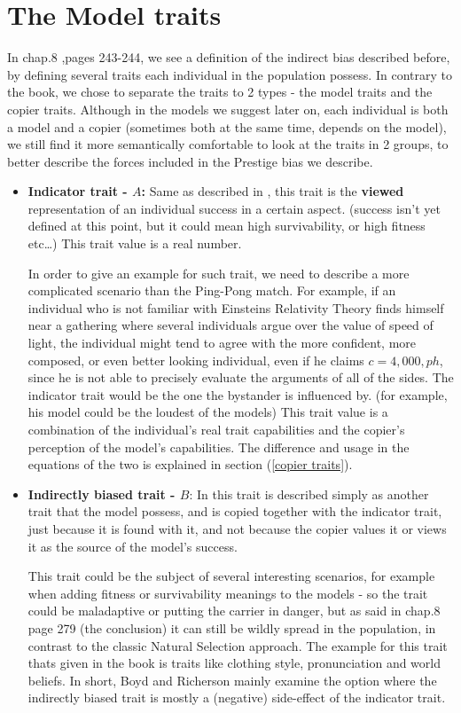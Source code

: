\documentclass[11pt]{article}
\begin{document}
 \section{The Model traits} \label{model traits}
 In \cite{evolutionBook} chap.8 ,pages 243-244, we see a definition of the indirect bias described before, by defining several traits each individual in the population possess.
 In contrary to the book, we chose to separate the traits to 2 types - the model traits and the copier traits.
 Although in the models we suggest later on, each individual is both a model and a copier (sometimes both at the same time, depends on the model), we still find it more semantically comfortable to look at the traits in 2 groups, to better describe the forces included in the Prestige bias we describe.
 \begin{itemize}
  \item \textbf{Indicator trait - $A$:} Same as described in \cite{evolutionBook}, this trait is the \textbf{viewed} representation of an individual success in a certain aspect. (success isn't yet defined
  at this point, but it could mean high survivability, or high fitness etc\dots) This trait value is a real number.
  
  In order to give an example for such trait, we need to describe a more complicated scenario than the Ping-Pong match. For example, if an individual who is not familiar with Einsteins Relativity Theory finds himself near a gathering where several individuals argue over the value of speed of light, the individual might tend to agree with the more confident, more composed, or even better looking individual, even if he claims  $c=4,000 ,ph$, since he is not able to precisely evaluate the arguments of all of the sides. The indicator trait would be the one the bystander is influenced by. (for example, his model could be the loudest of the models)
  This trait value is a combination of the individual's real trait capabilities and the copier's perception of the model's capabilities. The difference and usage in the equations of the two is explained in section (\ref{copier traits}).
   
  \item \textbf{Indirectly biased trait - $B$}: In \cite{evolutionBook} this trait is described simply as another trait that the model possess, and is copied together with the indicator trait, just because it is found with it, and not because the copier values it or views it as the source of the model's success.
  
  This trait could be the subject of several interesting scenarios, for example when adding fitness or survivability meanings to the models - so the trait could be maladaptive or putting the carrier in danger, but as said in \cite{evolutionBook} chap.8 page 279 (the conclusion) it can still be wildly spread in the population, in contrast to the classic Natural Selection approach. The example for this trait thats given in the book is traits like clothing style, pronunciation and world beliefs. In short, Boyd and Richerson mainly examine the option where the indirectly biased trait is mostly a (negative) side-effect of the indicator trait.


\end{itemize}
\end{document}
